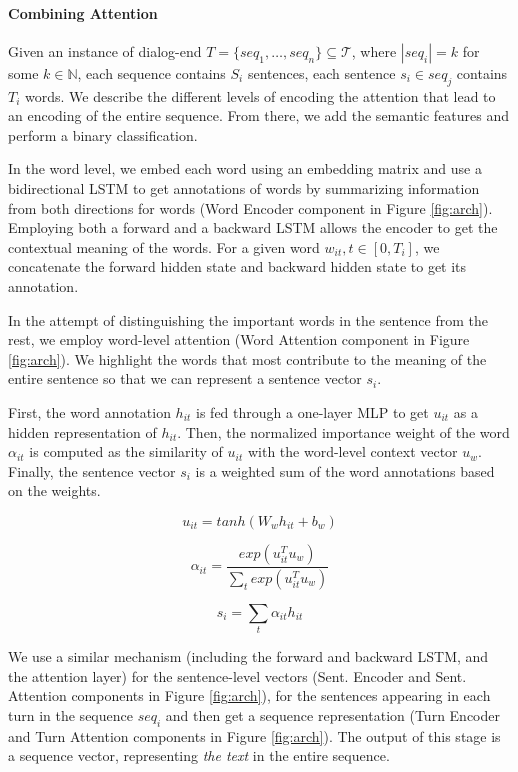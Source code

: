 \paragraph*{Combining Attention}
Given an instance of dialog-end $T=\{seq_1, \ldots, seq_n\} \subseteq \mathcal{T}$, where $|seq_i| = k$ for some $k \in \mathbb{N}$, each sequence contains $S_i$ sentences, each sentence $s_i \in seq_j$ contains $T_i$ words. 
We describe the different levels of encoding the attention that lead 
to an encoding of the entire sequence. From there, we add the semantic features and perform 
a binary classification. 

In the word level, we embed each word using an embedding matrix \cite{glove} 
and use a bidirectional LSTM 
to get annotations of words by summarizing information
from both directions for words (Word Encoder component in Figure \ref{fig:arch}). 
Employing both a forward and a backward LSTM 
allows the encoder to get the contextual meaning of the words. 
For a given word $w_{it}, t\in [0,T_i]$, 
we concatenate the forward hidden state and
backward hidden state to get its annotation. 

In the attempt of distinguishing the important 
words in the sentence from the rest, we employ word-level 
attention (Word Attention component in Figure \ref{fig:arch}). We highlight the words that most contribute 
to the meaning of the entire sentence so that we can represent 
a sentence vector $s_i$. 

First, the word annotation $h_{it}$ is fed 
through a one-layer MLP to get $u_{it}$ as a hidden representation
of $h_{it}$. Then, the normalized importance weight of the word $\alpha_{it}$ 
is computed as the similarity of $u_{it}$ with the word-level 
context vector $u_w$. 
Finally, the sentence vector $s_i$ is a weighted sum of the word annotations
based on the weights. 

\begin{equation*}
	u_{it} = tanh(W_w h_{it} + b_w)
\end{equation*}

\begin{equation*}
	\alpha_{it} = \frac{exp(u^T_{it} u_w)}{\sum_t exp(u^T_{it} u_w)}
\end{equation*}

\begin{equation*}
	s_i = \sum_{t} \alpha_{it} h_{it}
\end{equation*}

We use a similar mechanism (including the forward and backward 
LSTM, and the attention layer) for the sentence-level vectors (Sent. Encoder and Sent. Attention components in Figure \ref{fig:arch}), 
for the sentences appearing in each turn in the sequence $seq_i$ and then get a sequence representation 
(Turn Encoder and Turn Attention components in Figure \ref{fig:arch}). 
The output of this stage is a sequence vector, representing {\em the text} in the entire sequence. 

